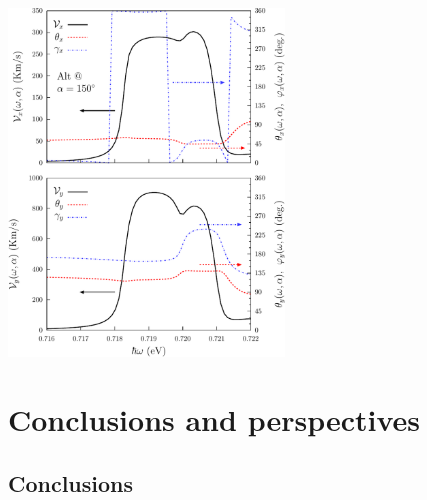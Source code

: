 \documentclass{beamer}
\begin{document}

\begin{frame}

\begin{center}
\includegraphics[width=0.55\textwidth]{figs/fig9.pdf}
\end{center}  

\end{frame}




\section{Conclusions and perspectives} 



\subsection{Conclusions}
\end{document}

